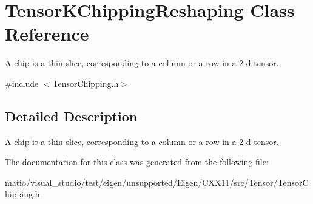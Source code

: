 \hypertarget{class_tensor_k_chipping_reshaping}{}\section{Tensor\+K\+Chipping\+Reshaping Class Reference}
\label{class_tensor_k_chipping_reshaping}


A chip is a thin slice, corresponding to a column or a row in a 2-\/d tensor.  




{\ttfamily \#include $<$Tensor\+Chipping.\+h$>$}



\subsection{Detailed Description}
A chip is a thin slice, corresponding to a column or a row in a 2-\/d tensor. 

The documentation for this class was generated from the following file\+:\begin{DoxyCompactItemize}
\item 
matio/visual\+\_\+studio/test/eigen/unsupported/\+Eigen/\+C\+X\+X11/src/\+Tensor/\+Tensor\+Chipping.\+h\end{DoxyCompactItemize}

